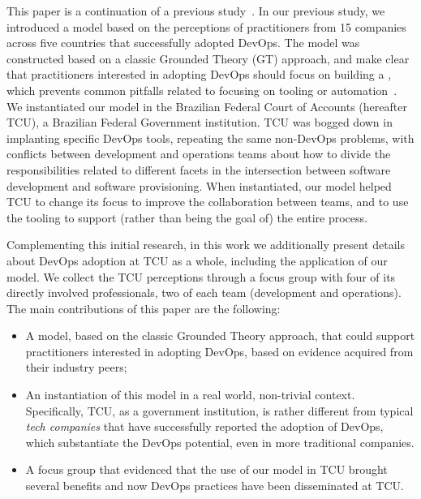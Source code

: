 This paper is a continuation of a previous study~\cite{Luz:2018:ESEM}.
In our previous study, we introduced a model based on the perceptions of practitioners from
15 companies across five countries that successfully adopted DevOps. The model
was constructed based on a classic Grounded Theory (GT) approach,
and make clear that practitioners interested in adopting DevOps should focus on building a
\cc, which prevents common pitfalls related to focusing on tooling or automation~\cite{Kromhout:2017:Queue}.
We instantiated our model in the Brazilian Federal Court of
Accounts (hereafter TCU), a Brazilian Federal Government institution. TCU was
bogged down in implanting specific DevOps tools, repeating the same non-DevOps
problems, with conflicts between development and operations teams about how to
divide the responsibilities related to different facets in the intersection
between software development and software provisioning. When instantiated,
our model helped TCU to change its focus to improve the collaboration between teams, and to use the tooling
to support (rather than being the goal of) the entire process.

Complementing this initial research, in this work we additionally present details
about DevOps adoption at TCU as a whole, including the application of our model.
We collect the TCU perceptions through a focus group with four of its directly
involved professionals, two of each team (development and operations).
The main contributions of this paper are the following:

\begin{itemize}
\item A model, based on the classic Grounded Theory approach, that could support practitioners interested in adopting DevOps,
      based on evidence acquired from their industry peers;
\item An instantiation of this model in a real world, non-trivial context. Specifically, TCU, as a government institution, is rather different from typical \emph{tech companies} that have successfully reported the adoption of DevOps, which substantiate the DevOps potential, even in more traditional companies.
\item A focus group that evidenced that the use of our model in TCU brought several benefits and
now DevOps practices have been disseminated at TCU.
\end{itemize}
